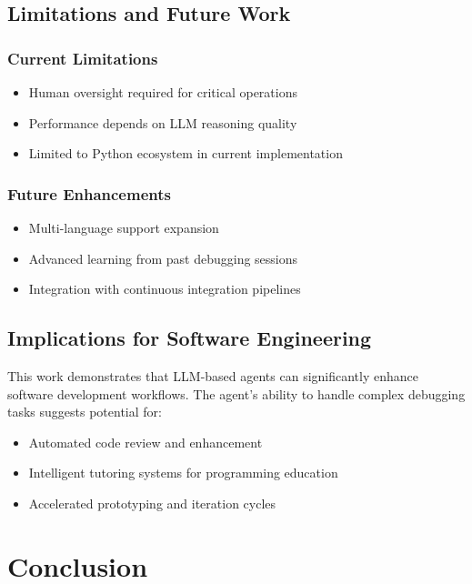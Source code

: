 \documentclass[12pt, a4paper]{article}
\begin{document}
\subsection{Limitations and Future Work}

\subsubsection{Current Limitations}
\begin{itemize}
    \item Human oversight required for critical operations
    \item Performance depends on LLM reasoning quality
    \item Limited to Python ecosystem in current implementation
\end{itemize}

\subsubsection{Future Enhancements}
\begin{itemize}
    \item Multi-language support expansion
    \item Advanced learning from past debugging sessions
    \item Integration with continuous integration pipelines
\end{itemize}

\subsection{Implications for Software Engineering}

This work demonstrates that LLM-based agents can significantly enhance software development workflows. The agent's ability to handle complex debugging tasks suggests potential for:
\begin{itemize}
    \item Automated code review and enhancement
    \item Intelligent tutoring systems for programming education
    \item Accelerated prototyping and iteration cycles
\end{itemize}

\section{Conclusion}
\end{document}
